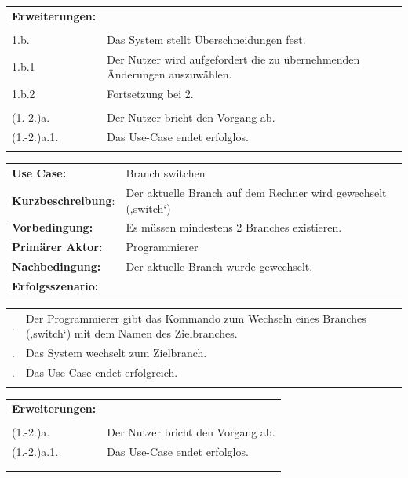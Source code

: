\documentclass[a4paper]{article}
\begin{document}
\begin{tabularx}{\textwidth}{lX}
\textbf{Erweiterungen:}\\\\
\qquad \qquad 1.b. & Das System stellt Überschneidungen fest.\\
\qquad \qquad 1.b.1 & Der Nutzer wird aufgefordert die zu übernehmenden Änderungen auszuwählen.\\
\qquad \qquad 1.b.2 & Fortsetzung bei 2.\\\\
\qquad \qquad (1.-2.)a. & Der Nutzer bricht den Vorgang ab.\\
\qquad \qquad (1.-2.)a.1. & Das Use-Case endet erfolglos.\\\\

\end{tabularx}
\newpage
\begin{tabularx}{\textwidth}{lX}
\textbf{Use Case:} & Branch switchen\\
\textbf{Kurzbeschreibung}: &	Der aktuelle Branch auf dem Rechner wird gewechselt (‚switch‘)\\
\textbf{Vorbedingung:} & Es müssen mindestens 2 Branches existieren.\\
\textbf{Primärer Aktor:} & Programmierer\\
\textbf{Nachbedingung:} & Der aktuelle Branch wurde gewechselt.\\
\textbf{Erfolgsszenario:} &
\end{tabularx}

\begin{tabularx}{\textwidth}{lX}
\\
\qquad 1. & Der Programmierer gibt das Kommando zum Wechseln eines Branches (‚switch‘) mit dem Namen des Zielbranches.\\
\qquad 2. & Das System wechselt zum Zielbranch.\\
\qquad 3. & Das Use Case endet erfolgreich.\\\\\hline
\end{tabularx}

\begin{tabularx}{\textwidth}{lX}
\textbf{Erweiterungen:}\\\\
\qquad \qquad (1.-2.)a. & Der Nutzer bricht den Vorgang ab.\\
\qquad \qquad (1.-2.)a.1. & Das Use-Case endet erfolglos.\\\\\hline\hline\\
\end{tabularx}
\\
\end{document}
